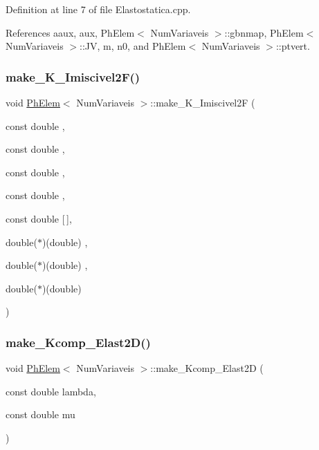 Definition at line 7 of file Elastostatica.\+cpp.



References aaux, aux, Ph\+Elem$<$ Num\+Variaveis $>$\+::gbnmap, Ph\+Elem$<$ Num\+Variaveis $>$\+::\+JV, m, n0, and Ph\+Elem$<$ Num\+Variaveis $>$\+::ptvert.

\mbox{\label{classPhElem_ae0418a5de14872e80fe4f9ffd9dd4fdd}} 
\subsubsection{\texorpdfstring{make\+\_\+\+K\+\_\+\+Imiscivel2\+F()}{make\_K\_Imiscivel2F()}}
{\footnotesize\ttfamily void \hyperlink{classPhElem}{Ph\+Elem}$<$ Num\+Variaveis $>$\+::make\+\_\+\+K\+\_\+\+Imiscivel2F (\begin{DoxyParamCaption}\item[{const double}]{,  }\item[{const double}]{,  }\item[{const double}]{,  }\item[{const double}]{,  }\item[{const double}]{\mbox{[}$\,$\mbox{]},  }\item[{double($\ast$)(double)}]{,  }\item[{double($\ast$)(double)}]{,  }\item[{double($\ast$)(double)}]{ }\end{DoxyParamCaption})\hspace{0.3cm}{\ttfamily [inherited]}}

\mbox{\label{classPhElem_a1223b3e50580a1a7959e5f3b665d0761}} 
\subsubsection{\texorpdfstring{make\+\_\+\+Kcomp\+\_\+\+Elast2\+D()}{make\_Kcomp\_Elast2D()}}
{\footnotesize\ttfamily void \hyperlink{classPhElem}{Ph\+Elem}$<$ Num\+Variaveis $>$\+::make\+\_\+\+Kcomp\+\_\+\+Elast2D (\begin{DoxyParamCaption}\item[{const double}]{lambda,  }\item[{const double}]{mu }\end{DoxyParamCaption})\hspace{0.3cm}{\ttfamily [inherited]}}



